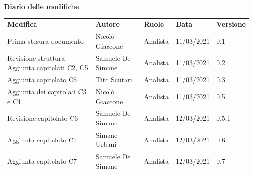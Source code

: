 \documentclass[a4paper]{article}
\begin{document}
\begin{center}

    \textbf{\Large Diario delle modifiche}\\
    \vspace{10px}
    \begin{table}[h!]
        \centering
        \renewcommand{\arraystretch}{1.8}
        \begin{tabular}{p{150px} p{90px} p{50px} p{60px} p{45px}}
            \rowcolor{logo!70} \textbf{Modifica}                    & \textbf{Autore}   & \textbf{Ruolo} & \textbf{Data} & \textbf{Versione} \\
            Prima stesura documento                                 & Nicolò Giaccone   & Analista       & 11/03/2021    & 0.1               \\
            Revisione struttura \newline Aggiunta capitolati C2, C5 & Samuele De Simone & Analista       & 11/03/2021    & 0.2               \\
            Aggiunta capitolato C6                                  & Tito Scutari      & Analista       & 11/03/2021    & 0.3               \\
            Aggiunta dei capitolati C3 e C4                         & Nicolò Giaccone   & Analista       & 11/03/2021    & 0.5               \\
            Revisione capitolato C6                                 & Samuele De Simone & Analista       & 12/03/2021    & 0.5.1             \\
            Aggiunta capitolato C1                                  & Simone Urbani     & Analista       & 12/03/2021    & 0.6               \\
            Aggiunta capitolato C7                                  & Samuele De Simone & Analista       & 12/03/2021    & 0.7               \\
        \end{tabular}
    \end{table}
\end{center}
\newpage
\tableofcontents
\newpage








\end{document}
